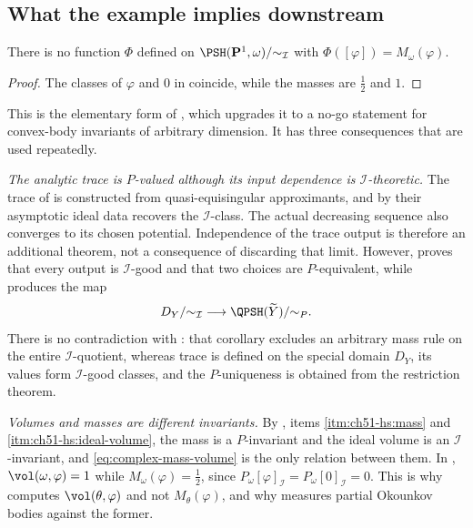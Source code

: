 \subsection{What the example implies downstream}
\label{sec:ch51-cantor-consequences}

\begin{corollary}
\label{cor:ch51-no-i-invariant-mass}
There is no function $\Phi$ defined on
$\PSH(\mathbf P^1,\omega)/{\sim_{\mathcal I}}$ with
$\Phi([\varphi])=M_\omega(\varphi)$.
\end{corollary}

\begin{proof}
The classes of $\varphi$ and $0$ in
 coincide, while the masses are $\tfrac12$ and
$1$.
\end{proof}

This is the elementary form of , which
upgrades it to a no-go statement for convex-body invariants of arbitrary
dimension.  It has three consequences that are used repeatedly.

\emph{The analytic trace is $P$-valued although its input dependence is
$\mathcal I$-theoretic.}  The trace of
 is constructed from
quasi-equisingular approximants, and by
 their asymptotic ideal data recovers
the $\mathcal I$-class.  The actual decreasing sequence also converges
to its chosen potential.  Independence of the trace output is therefore
an additional theorem, not a consequence of discarding that limit.  However,
 proves that every output is
$\mathcal I$-good and that two choices are $P$-equivalent, while
 produces the map
\[
 D_Y/{\sim_{\mathcal I}}
 \longrightarrow
 \QPSH(\widetilde Y)/{\sim_P}.
\]
There is no contradiction with :
that corollary excludes an arbitrary mass rule on the entire
$\mathcal I$-quotient, whereas trace is defined on the special domain
$D_Y$, its values form $\mathcal I$-good classes, and the
$P$-uniqueness is obtained from the restriction theorem.

\emph{Volumes and masses are different invariants.}  By
, items \cref{itm:ch51-hs:mass} and
\cref{itm:ch51-hs:ideal-volume}, the mass is a $P$-invariant and the
ideal volume is an $\mathcal I$-invariant, and
\eqref{eq:complex-mass-volume} is the only relation between them.  In
, $\vol(\omega,\varphi)=1$ while
$M_\omega(\varphi)=\tfrac12$, since
$P_\omega[\varphi]_{\mathcal I}=P_\omega[0]_{\mathcal I}=0$.  This is
why  computes
$\vol(\theta,\varphi)$ and not $M_\theta(\varphi)$, and why
 measures partial Okounkov bodies
against the former.

